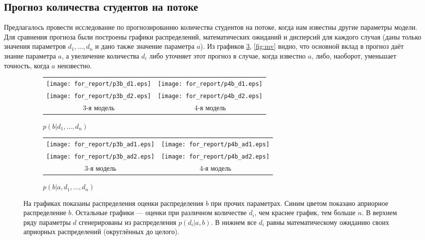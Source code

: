 \documentclass[12pt,a4paper]{article}
\begin{document}
\subsection{Прогноз количества студентов на потоке}

Предлагалось провести исследование по прогнозированию количества студентов на потоке, когда нам известны другие параметры модели.
Для сравнения прогноза были построены графики распределений, математических ожиданий и дисперсий для каждого случая (даны только значения параметров $d_1, \dots, d_n$ и дано также значение параметра $a$).
Из графиков \ref{fig:pb_d}, \ref{fig:mv} видно, что основной вклад в прогноз даёт знание параметра $a$, а увеличение количества $d_i$ либо уточняет этот прогноз в случае, когда известно $a$, либо, наоборот, уменьшает точность, когда $a$ неизвестно.

\begin{figure}[p]
  \centering
  \begin{subfigure}[b]{0.48\textwidth}
    \centering
    \begin{tabular}{cc}
      \texttt{[image: for\_report/p3b\_d1.eps]} &
      \texttt{[image: for\_report/p4b\_d1.eps]} \\
      \texttt{[image: for\_report/p3b\_d2.eps]} &
      \texttt{[image: for\_report/p4b\_d2.eps]} \\
      3-я модель & 4-я модель
    \end{tabular}
    
    \label{fig:pb_d}
    \caption{$p(b | d_1, \dots, d_n)$}
  \end{subfigure}
  \begin{subfigure}[b]{0.48\textwidth}
    \centering
    \begin{tabular}{cc}
      \texttt{[image: for\_report/p3b\_ad1.eps]} &
      \texttt{[image: for\_report/p4b\_ad1.eps]} \\
      \texttt{[image: for\_report/p3b\_ad2.eps]} &
      \texttt{[image: for\_report/p4b\_ad2.eps]} \\
      3-я модель & 4-я модель
    \end{tabular}
    \label{fig:pb_ad}
    \caption{$p(b | a, d_1, \dots, d_n)$}
  \end{subfigure}
  \caption{На графиках показаны распределения оценки распределения $b$ при прочих параметрах. Синим цветом показано априорное распределение $b$. Остальные графики --- оценки при различном количестве $d_i$, чем краснее график, тем больше $n$. В верхнем ряду параметры $d$ сгенерированы из распределения $p(d_i | a, b)$. В нижнем все $d_i$ равны математическому ожиданию своих априорных распределений (округлённых до целого).}
  \label{fig:pb_d}
\end{figure}
\end{document}
